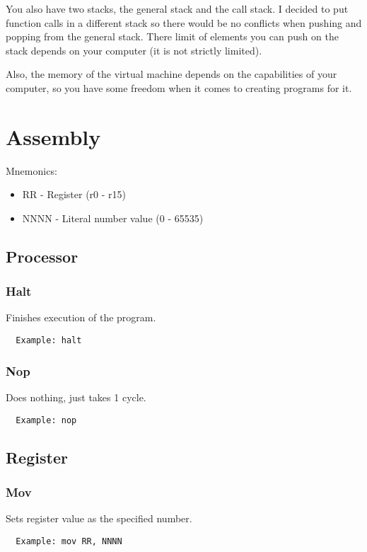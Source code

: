 \documentclass[oneside]{book}
\begin{document}
  You also have two stacks, the general stack and the call stack. I decided to put function calls in a different stack so there would be no conflicts when pushing and popping from the general stack. There limit of elements you can push on the stack depends on your computer (it is not strictly limited).
  
  Also, the memory of the virtual machine depends on the capabilities of your computer, so you have some freedom when it comes to creating programs for it.
  
  
  \chapter{Assembly}
  Mnemonics: 
  \begin{itemize}
    \item RR - Register (r0 - r15)
    \item NNNN - Literal number value (0 - 65535)
  \end{itemize}
  
    \section{Processor}
  
    \subsection{Halt}
  Finishes execution of the program.
  \begin{Verbatim}
  Example: halt
  \end{Verbatim}
  
    \subsection{Nop}
  Does nothing, just takes 1 cycle.
  \begin{Verbatim}
  Example: nop
  \end{Verbatim}
  
    \section{Register}
  
   \subsection{Mov}
  Sets register value as the specified number.
  \begin{Verbatim}
  Example: mov RR, NNNN
  \end{Verbatim}
  
\end{document}
